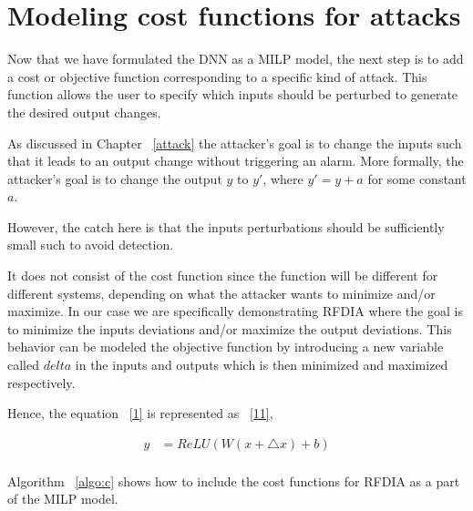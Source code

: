 \section{Modeling cost functions for attacks}
\label{section:costfunction}
Now that we have formulated the DNN as a MILP model, the next step is to add a cost or objective function corresponding to a specific kind of attack. 
This function allows the user to specify which inputs should be perturbed to generate the desired output changes.

As discussed in Chapter ~\ref{attack} the attacker's goal is to change the inputs such that it leads to an output change without triggering an alarm.
More formally, the attacker's goal is to change the output $y$ to $y'$, where $y' = y + a$ for some constant $a$. 

 



However, the catch here is that the inputs perturbations should be sufficiently small such to avoid detection.  


It does not consist of the cost function since the function will be different for different systems, depending on what the attacker wants to minimize and/or maximize.
In our case we are specifically demonstrating \ac{RFDIA} where the goal is to minimize the inputs deviations and/or maximize the output deviations.  
This behavior can be modeled the objective function by introducing a new variable called $delta$ in the inputs and outputs which is then minimized and maximized  respectively. 

Hence, the equation ~\ref{1} is represented as ~\ref{11},

\begin{align}
\label{11}
y &=  ReLU(W(x + \bigtriangleup  x ) + b)\\
\end{align}

Algorithm ~\ref{algo:c} shows how to include the cost functions for \ac{RFDIA} as a part of the MILP model. 
 
